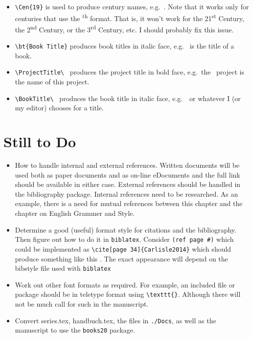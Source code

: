 \begin{itemize}

\item \verb|\Cen{19}| is used to produce century names,
  e.g.\ . Note that it works only for centuries that use the
  \textsuperscript{th} format.  That is, it won't work for the
  21\textsuperscript{st} Century, the 2\textsuperscript{nd} Century,
  or the 3\textsuperscript{rd} Century, etc. I should probably fix
  this issue.

\item \verb|\bt{Book Title}| produces book titles in italic face,
e.g.\  is the title of a book.

\item \verb|\ProjectTitle\ | produces the project title in bold face,
  e.g.\ the \ProjectTitle\ project is the name of this project.

\item \verb|\BookTitle\ | produces the book title in italic face,
  e.g.\ \BookTitle\ or whatever I (or my editor) chooses for a title.

\end{itemize}

\section{Still to Do}

\begin{itemize}

\item How to handle internal and external references.  Written
  documents will be used both as paper documents and as on-line
  eDocuments and the full link should be available in either
  case. External references should be handled in the bibliography
  package. Internal references need to be researched.  As an example,
  there is a need for mutual references between this chapter and the
  chapter on English Grammer and Style.

\item Determine a good (useful) format style for citations and the
  bibliography.  Then figure out how to do it in \texttt{biblatex}.
  Consider \texttt{(ref page \#)} which could be implemented as
  \verb|\cite[page 34]{Carlisle2014}| which should produce something
  like this \cite[page 34]{Carlisle2014}. The exact appearance will
  depend on the bibstyle file used with \texttt{biblatex}

\item Work out other font formats as required. For example, an included
  file or package should be in teletype format using \verb|\texttt{}|.
  Although there will not be much call for such in the manuscript.

\item Convert series.tex, handbuch.tex, the files in \texttt{./Docs}, as
  well as the manuscript to use the \texttt{books20} package.

\end{itemize}

